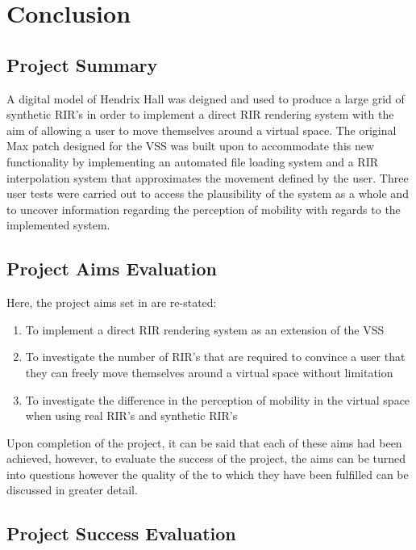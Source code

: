 \documentclass[../../main.tex]{subfiles}
\begin{document}
	\section{Conclusion}
	
		\subsection{Project Summary}
		A digital model of Hendrix Hall was deigned and used to produce a large grid of synthetic \ac{RIR}'s in order to implement a direct \ac{RIR} rendering system with the aim of allowing a user to move themselves around a virtual space. The original Max patch designed for the \ac{VSS} was built upon to accommodate this new functionality by implementing an automated file loading system and a \ac{RIR} interpolation system that approximates the movement defined by the user. Three user tests were carried out to access the plausibility of the system as a whole and to uncover information regarding the perception of mobility with regards to the implemented system. 

		\subsection{Project Aims Evaluation}

		Here, the project aims set in  are re-stated:

		\begin{enumerate}
			\item To implement a direct \ac{RIR} rendering system as an extension of the \ac{VSS}

			\item To investigate the number of \ac{RIR}'s that are required to convince a user that they can freely move themselves around a virtual space without limitation

			\item To investigate the difference in the perception of mobility in the virtual space when using real \ac{RIR}'s and synthetic \ac{RIR}'s
		\end{enumerate}

		Upon completion of the project, it can be said that each of these aims had been achieved, however, to evaluate the success of the project, the aims can be turned into questions  however the quality of the  to which they have been fulfilled can be discussed in greater detail.

		\subsection{Project Success Evaluation}
\end{document}
